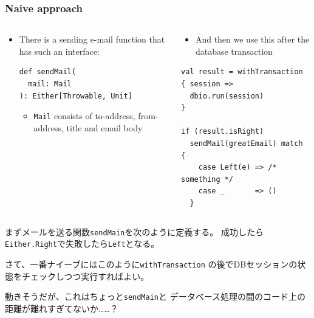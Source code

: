 \begin{frame}[fragile]
  \label{fra:send_email_definition}
  \frametitle{Naive approach}

  \begin{columns}
    \pause
    \begin{column}{0.5\textwidth}
      \begin{itemize}
        \item There is a sending e-mail function that has
        such an interface:
\begin{lstlisting}[style=scala]
def sendMail(
  mail: Mail
): Either[Throwable, Unit]
\end{lstlisting}

        \begin{itemize}  
          \item \lstinline|Mail| consists of to-address,
          from-address, title and email body
        \end{itemize}
      \end{itemize}
    \end{column}

    \pause
    \begin{column}{0.5\textwidth}
      \begin{itemize}
        \item And then we use this after the database transaction
      \end{itemize}

\begin{lstlisting}[style=scala]
val result = withTransaction { session =>
  dbio.run(session)
}

if (result.isRight)
  sendMail(greatEmail) match {
    case Left(e) => /* something */
    case _       => ()
  }
\end{lstlisting}
    \end{column}
  \end{columns}

  \pause

  \begin{notes}
    \item まずメールを送る関数\lstinline|sendMain|を次のように定義する。
    成功したら\lstinline|Either.Right|で失敗したら\lstinline|Left|となる。
     
    \item さて、一番ナイーブにはこのように\lstinline|withTransaction|
    の後でDBセッションの状態をチェックしつつ実行すればよい。
     
    \item 動きそうだが、これはちょっと\lstinline|sendMain|と
    データベース処理の間のコード上の距離が離れすぎてないか……？
  \end{notes}
\end{frame}
 
